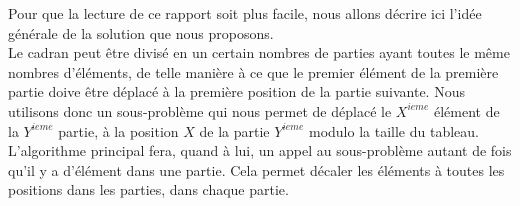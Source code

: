 Pour que la lecture de ce rapport soit plus facile, nous allons décrire ici l'idée générale de la solution que nous proposons. \\

Le cadran peut être divisé en un certain nombres de parties ayant toutes le même nombres d'éléments, de telle manière à ce que le premier élément de la première partie doive être déplacé à la première position de la partie suivante. Nous utilisons donc un sous-problème qui nous permet de déplacé le $X^{ieme}$ élément de la $Y^{ieme}$ partie, à la position $X$ de la partie $Y^{ieme}$ modulo la taille du tableau. L'algorithme principal fera, quand à lui, un appel au sous-problème autant de fois qu'il y a d'élément dans une partie. Cela permet décaler les éléments à toutes les positions dans les parties, dans chaque partie. 